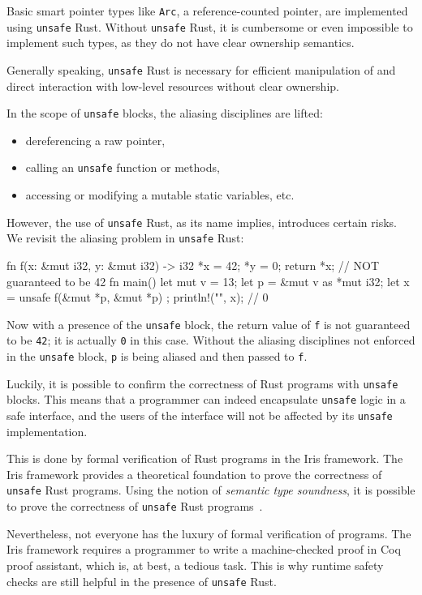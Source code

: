 \documentclass[en]{snu-ece-bsc-thesis}
\theoremstyle{definition}
\begin{document}
Basic smart pointer types like \verb/Arc/, a reference-counted pointer, are implemented using \verb/unsafe/ Rust.
Without \verb/unsafe/ Rust, it is cumbersome or even impossible to implement such types, as they do not have clear ownership semantics.

Generally speaking, \verb/unsafe/ Rust is necessary for efficient manipulation of and direct interaction with low-level resources without clear ownership.

In the scope of \texttt{unsafe} blocks, the aliasing disciplines are lifted:
\begin{itemize}
  \item dereferencing a raw pointer,
  \item calling an \verb/unsafe/ function or methods,
  \item accessing or modifying a mutable static variables, etc.
\end{itemize}

However, the use of \verb/unsafe/ Rust, as its name implies, introduces certain risks.
We revisit the aliasing problem in \verb/unsafe/ Rust:
\begin{rscode}
fn f(x: &mut i32, y: &mut i32) -> i32 {
    *x = 42;
    *y = 0;
    return *x; // NOT guaranteed to be 42
}
fn main() {
    let mut v = 13;
    let p = &mut v as *mut i32;
    let x = unsafe {
        f(&mut *p, &mut *p)
    };
    println!("{}", x); // 0
}
\end{rscode}
Now with a presence of the \verb/unsafe/ block, the return value of \verb/f/ is not guaranteed to be \verb/42/; it is actually \verb/0/ in this case.
Without the aliasing disciplines not enforced in the \verb/unsafe/ block, \verb/p/ is being aliased and then passed to \verb/f/.

Luckily, it is possible to confirm the correctness of Rust programs with \verb/unsafe/ blocks.
This means that a programmer can indeed encapsulate \verb/unsafe/ logic in a safe interface, and the users of the interface will not be affected by its \verb/unsafe/ implementation.

This is done by formal verification of Rust programs in the Iris framework.
The Iris framework provides a theoretical foundation to prove the correctness of \verb/unsafe/ Rust programs.
Using the notion of \emph{semantic type soundness}, it is possible to prove the correctness of \verb/unsafe/ Rust programs~\cite{jung:20}.

Nevertheless, not everyone has the luxury of formal verification of programs.
The Iris framework requires a programmer to write a machine-checked proof in Coq proof assistant, which is, at best, a tedious task.
This is why runtime safety checks are still helpful in the presence of \verb/unsafe/ Rust.
\end{document}
